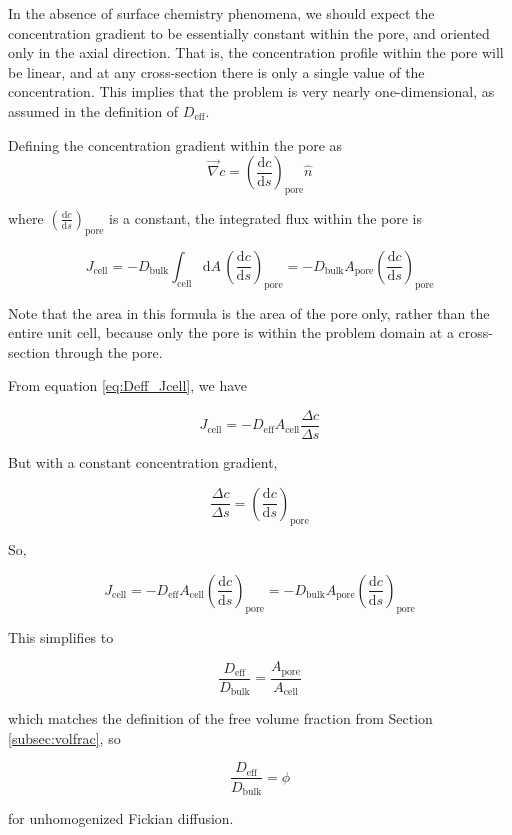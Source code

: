 In the absence of surface chemistry phenomena,
we should expect the concentration gradient
to be essentially constant within the pore, and oriented only in the axial direction.
That is, the concentration profile within the pore will be linear,
and at any cross-section there is only a single value of the concentration.
This implies that the problem is very nearly one-dimensional,
as assumed in the definition of $D_{\mathrm{eff}}$.

Defining the concentration gradient within the pore as
\begin{equation}
\vec{\nabla} c = \left(\frac{\mathrm{d}c}{\mathrm{d}s}\right)_{\mathrm{pore}} \hat{n}
\end{equation}

where $\left(\frac{\mathrm{d}c}{\mathrm{d}s}\right)_{\mathrm{pore}}$ is a constant,
the integrated flux within the pore is

\begin{equation}
J_\mathrm{cell} = -D_\mathrm{bulk} \int_\mathrm{cell} \mathrm{d}A\, \left(\frac{\mathrm{d}c}{\mathrm{d}s}\right)_{\mathrm{pore}}
 = -D_\mathrm{bulk} A_\mathrm{pore} \left(\frac{\mathrm{d}c}{\mathrm{d}s}\right)_{\mathrm{pore}}
\end{equation}

Note that the area in this formula is the area of the pore only,
rather than the entire unit cell, because only the pore is within the problem domain
at a cross-section through the pore.

From equation \ref{eq:Deff_Jcell}, we have

\begin{equation}
J_{\mathrm{cell}} = - D_{\mathrm{eff}} A_{\mathrm{cell}} \frac{\Delta c}{\Delta s}
\end{equation}

But with a constant concentration gradient,

\begin{equation}
\frac{\Delta c}{\Delta s} = \left(\frac{\mathrm{d}c}{\mathrm{d}s}\right)_{\mathrm{pore}}
\end{equation}

So,

\begin{equation}
J_{\mathrm{cell}} = - D_{\mathrm{eff}} A_{\mathrm{cell}} \left(\frac{\mathrm{d}c}{\mathrm{d}s}\right)_{\mathrm{pore}}
 = -D_\mathrm{bulk} A_\mathrm{pore} \left(\frac{\mathrm{d}c}{\mathrm{d}s}\right)_{\mathrm{pore}}
\end{equation}

This simplifies to

\begin{equation}
\frac{D_\mathrm{eff}}{D_\mathrm{bulk}} = \frac{A_\mathrm{pore}}{A_\mathrm{cell}}
\end{equation}

which matches the definition of the free volume fraction from Section \ref{subsec:volfrac}, so

\begin{equation}
\frac{D_\mathrm{eff}}{D_\mathrm{bulk}} = \phi
\end{equation}

for unhomogenized Fickian diffusion.
